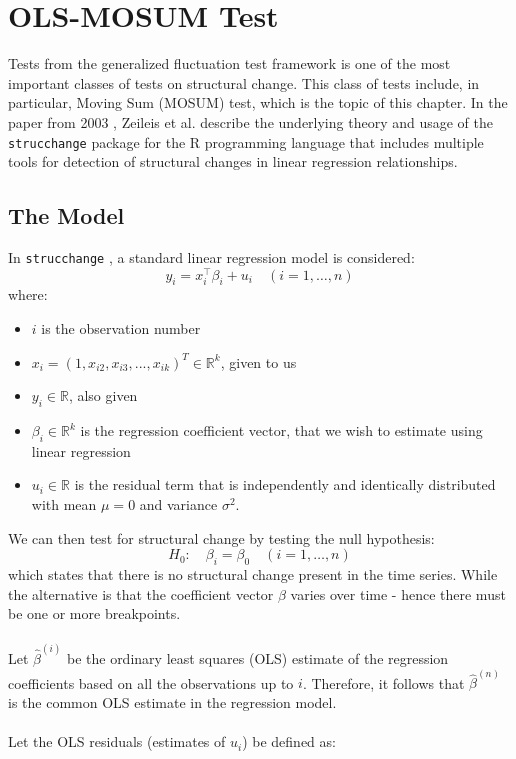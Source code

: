 \documentclass[main.tex]{subfiles}
\begin{document}
\chapter{OLS-MOSUM Test}
\label{chap:mosum}
Tests from the generalized fluctuation test framework \cite{kuan_hornik}
is one of the most important classes of tests on structural change. This class
of tests include, in particular, Moving Sum (MOSUM) test, which is the topic of this chapter.
In the paper from 2003 \cite{strucchange}, Zeileis et al. describe the
underlying theory and usage of the \texttt{strucchange} package for the
R programming language that includes multiple tools for detection of structural
changes in linear regression relationships.

\section{The Model}
\label{sec:model}
In \texttt{strucchange} \cite{strucchange}, a standard linear regression model is considered:
\[
y_{i}=x_{i}^{\top} \beta_{i}+u_{i} \quad(i=1, \ldots, n)
\]
where:
\begin{itemize}
\item $i$ is the observation number
\item $x_i = (1,x_{i2}, x_{i3}, ..., x_{ik})^T \in \mathbb{R}^k$, given to us
\item $y_i \in \mathbb{R}$, also given
\item $\beta_i \in \mathbb{R}^{k} $ is the regression coefficient vector, that
  we wish to estimate using linear regression
\item $u_i \in \mathbb{R}$ is the residual term that is independently and identically
  distributed with mean $\mu = 0$ and variance $\sigma^2$.
\end{itemize}
We can then test for structural change by testing the null hypothesis:
\[
H_0:\quad \beta_i = \beta_0 \quad(i=1, \ldots, n)
\]
which states that there is no structural change present in the time series.
While the alternative is that the coefficient vector $\beta$ varies over time -
hence there must be one or more breakpoints. \\\\
Let $\hat{\beta}^{(i)}$ be the ordinary least squares (OLS) estimate of the
regression coefficients based on all the observations up to $i$.
Therefore, it follows that $\hat{\beta}^{(n)}$ is the common OLS estimate in the regression model. \\\\
Let the OLS residuals (estimates of $u_i$) be defined as:
\end{document}

